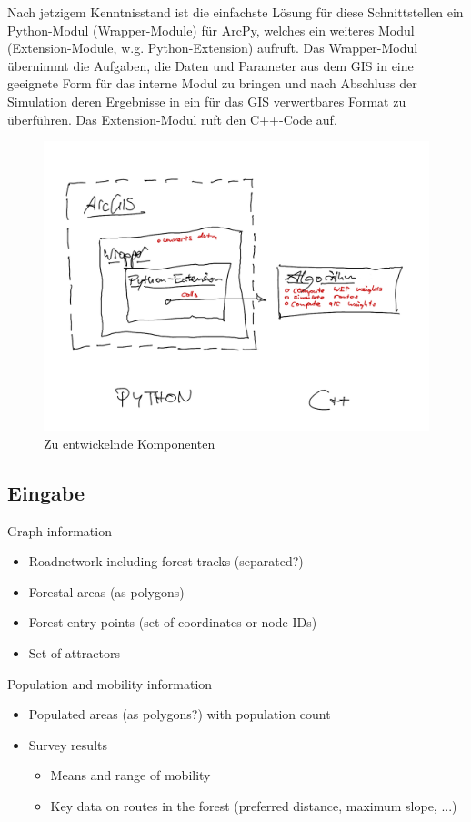 \documentclass[parskip=half,german]{scrartcl}
\begin{document}
Nach jetzigem Kenntnisstand ist die einfachste Lösung für diese Schnittstellen
ein Python-Modul (Wrapper-Module) für ArcPy, welches ein weiteres Modul
(Extension-Module, w.g. Python-Extension) aufruft. Das Wrapper-Modul
übernimmt die Aufgaben, die Daten und Parameter aus dem GIS in eine geeignete
Form für das interne Modul zu bringen und nach Abschluss der Simulation deren
Ergebnisse in ein für das GIS verwertbares Format zu überführen. Das
Extension-Modul ruft den C++-Code auf.

\begin{figure}
  \includegraphics[width=\textwidth]{UML.png}
  \caption{Zu entwickelnde Komponenten}
\end{figure}

\subsection*{Eingabe}
     Graph information
     \begin{itemize}
      \item Roadnetwork including forest tracks (separated?)
      \item Forestal areas (as polygons)
      \item Forest entry points (set of coordinates or node IDs)
      \item Set of attractors 
     \end{itemize}
     
     Population and mobility information
     \begin{itemize}
      \item Populated areas (as polygons?) with population count
      \item Survey results 
        \begin{itemize}
         \item Means and range of mobility
         \item Key data on routes in the forest (preferred distance, maximum
slope, ...)
        \end{itemize}

     \end{itemize}
\end{document}
